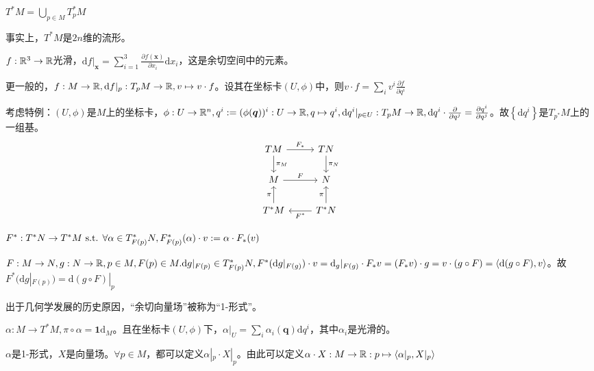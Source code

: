 \documentclass{ctexbook}
\begin{document}
\begin{Def}
  $T^{*}M=\bigcup_{p\in M}^{}T^{*}_pM$
\end{Def}
事实上，$T^{*}M$是$2n$维的流形。

\begin{Eg}
  $f:\mathbb{R}^3\to \mathbb{R}$光滑，$\mathrm{d}f|_{\bm{x}}=\sum\limits_{i=1}^{3}\frac{\partial f(\bm{x})}{\partial x_{i}} \mathrm{d}x_{i}$，这是余切空间中的元素。

  更一般的，$f:M\to\mathbb{R}, \mathrm{d}f|_p: T_pM\to \mathbb{R}, v\mapsto v\cdot f$。设其在坐标卡$(U,\phi)$中，则$v\cdot f=\sum\limits_{i}^{}v^i \frac{\partial f}{\partial q^{i}}$
\end{Eg}


考虑特例：$(U,\phi)$是$M$上的坐标卡，$\phi:U\to \mathbb{R}^n, q^i:= (\phi(\bm{q}))^i: U\to\mathbb{R}, q\mapsto q^i, \mathrm{d}q^i|_{p\in U}:T_pM\to \mathbb{R}, \mathrm{d}q^i\cdot \frac{\partial }{\partial q^{j}}=\frac{\partial q^{i}}{\partial q^{j}}$。故$\left\{ \mathrm{d}q^i \right\}$是$T_{p^{*}}M$上的一组基。
\[\begin{tikzcd}
TM \arrow[d, "\pi_M"] \arrow[r, "F_*"] & TN \arrow[d, "\pi_N"]                  \\
M \arrow[r, "F"]                       & N                                      \\
T^*M \arrow[u, "\pi"]                  & T^*N \arrow[u, "\pi"] \arrow[l, "F^*"]
\end{tikzcd}\]

\begin{Def}
  $F^{*}:T^{*}N\to T^{*}M\text{ s.t. } \forall \alpha\in T_{F(p)}^{*}N, F^{*}_{F(p)}(\alpha)\cdot v:= \alpha \cdot F_{*}(v)$
\end{Def}

\begin{Eg}
  $F:M\to N, g:N\to\mathbb{R}, p\in M,F(p)\in M. \mathrm{d}g|_{F(p)}\in T^{*}_{F(p)}N, F^{*}(\mathrm{d}g|_{F(g)})\cdot v= \mathrm{d}_g|_{F(g)}\cdot F_{*}v=(F_{*}v)\cdot g=v\cdot (g\circ F)= \left\langle \mathrm{d}(g\circ F),v \right\rangle$。故$F^{*}( \mathrm{d}g|_{F(p)})= \mathrm{d}(g\circ F)|_{p}$
\end{Eg}

出于几何学发展的历史原因，“余切向量场”被称为“1-形式”。

\begin{Def}[1-形式]
  $\alpha:M\to T^{*}M, \pi\circ \alpha=\mathbf{1} \mathrm{d}_M$。且在坐标卡$(U,\phi)$下，$\alpha|_U=\sum_i\alpha_i(\mathbf{q}) \mathrm{d}q^i$，其中$\alpha_i$是光滑的。
\end{Def}

$\alpha$是1-形式，$X$是向量场。$\forall p\in M$，都可以定义$\alpha|_p\cdot X|_p$。由此可以定义$\alpha\cdot X: M\to\mathbb{R}: p\mapsto \left\langle \alpha|_p,X|_p \right\rangle$
\end{document}
